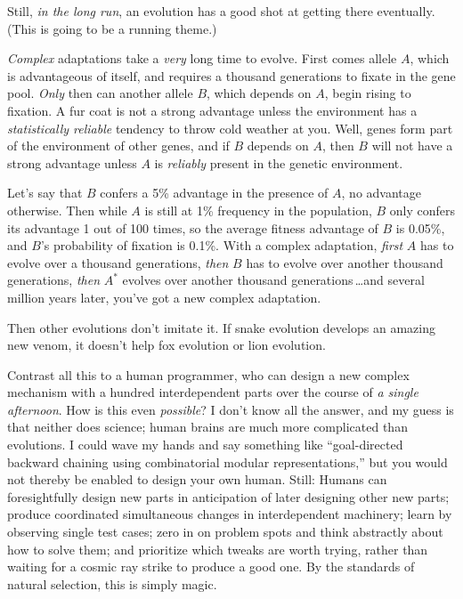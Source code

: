  Still, \textit{in the long run}, an evolution has a good shot at
getting there eventually. (This is going to be a running theme.)


 \textit{Complex} adaptations take a \textit{very} long time to
evolve. First comes allele $A$, which is advantageous of itself, and
requires a thousand generations to fixate in the gene pool.
\textit{Only} then can another allele $B$, which depends on $A$, begin
rising to fixation. A fur coat is not a strong advantage unless the
environment has a \textit{statistically reliable} tendency to throw
cold weather at you. Well, genes form part of the environment of other
genes, and if $B$ depends on $A$, then $B$ will not have a strong advantage
unless $A$ is \textit{reliably} present in the genetic environment.


 Let's say that $B$ confers a 5\% advantage in the
presence of $A$, no advantage otherwise. Then while $A$ is still at 1\%
frequency in the population, $B$ only confers its advantage 1 out of 100
times, so the average fitness advantage of $B$ is 0.05\%, and
$B$'s probability of fixation is 0.1\%. With a complex
adaptation, \textit{first} $A$ has to evolve over a thousand generations,
\textit{then} $B$ has to evolve over another thousand generations,
\textit{then} $A^{*}$ evolves over another thousand
generations\,\ldots and several million years later,
you've got a new complex adaptation.


 Then other evolutions don't imitate it. If snake
evolution develops an amazing new venom, it doesn't
help fox evolution or lion evolution.


 Contrast all this to a human programmer, who can design a new
complex mechanism with a hundred interdependent parts over the course
of \textit{a single afternoon}. How is this even \textit{possible}? I
don't know all the answer, and my guess is that neither
does science; human brains are much more complicated than evolutions. I
could wave my hands and say something like
``goal-directed backward chaining using combinatorial
modular representations,'' but you would not thereby
be enabled to design your own human. Still: Humans can foresightfully
design new parts in anticipation of later designing other new parts;
produce coordinated simultaneous changes in interdependent machinery;
learn by observing single test cases; zero in on problem spots and
think abstractly about how to solve them; and prioritize which tweaks
are worth trying, rather than waiting for a cosmic ray strike to
produce a good one. By the standards of natural selection, this is
simply magic.


